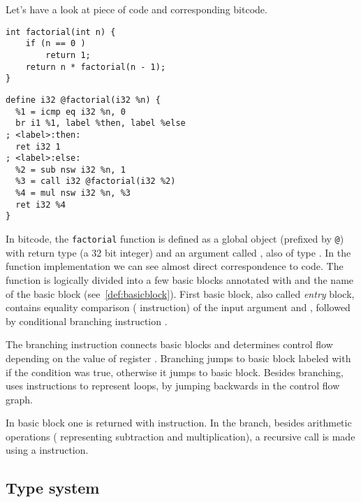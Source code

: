 \begin{example}
Let's have a look at piece of \Cpp{} code and corresponding \LLVM bitcode.

\begin{verbatim}
int factorial(int n) {
    if (n == 0 )
        return 1;
    return n * factorial(n - 1);
}
\end{verbatim}

\begin{verbatim}
define i32 @factorial(i32 %n) {
  %1 = icmp eq i32 %n, 0
  br i1 %1, label %then, label %else
; <label>:then:
  ret i32 1
; <label>:else:
  %2 = sub nsw i32 %n, 1
  %3 = call i32 @factorial(i32 %2)
  %4 = mul nsw i32 %n, %3
  ret i32 %4
}
\end{verbatim}

\noindent
In \LLVM bitcode, the \texttt{factorial} function is defined as a global object (prefixed by \texttt{@})
 with return type  (a 32 bit integer) and an argument called ,
also of type . In the function implementation we can see almost direct
correspondence to \Cpp{} code. The function is logically divided into a few basic
blocks annotated with  and the name of the basic block (see~\autoref{def:basicblock}). First basic block, also called \emph{entry} block,
contains equality comparison ( instruction) of the input argument 
and , followed by conditional branching instruction .

The branching instruction connects basic blocks and determines control flow depending
on the value of register . Branching jumps to basic block labeled with  if
the condition  was true, otherwise it jumps to  basic block. Besides
branching, \LLVM uses  instructions to represent loops, by jumping
backwards in the control flow graph.

\noindent
In basic block  one is returned with  instruction. In the  branch,
besides arithmetic operations ( representing subtraction and  multiplication),
a recursive call is made using a  instruction.
\end{example}

\subsection{Type system} \label{subsec:typesystem}

